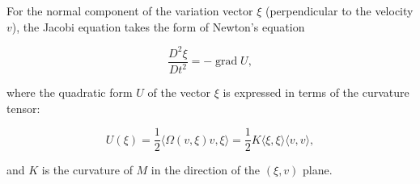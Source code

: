 For the normal component of the variation vector $\xi$ (perpendicular to the velocity $v$), the Jacobi equation takes the form of Newton's equation

$$\frac{D^2 \xi}{Dt^2} = -\operatorname{grad} U,$$

where the quadratic form $U$ of the vector $\xi$ is expressed in terms of the curvature tensor:

$$U(\xi) = \frac{1}{2} \langle \Omega(v, \xi)v, \xi \rangle = \frac{1}{2} K \langle \xi, \xi \rangle \langle v, v \rangle,$$

and $K$ is the curvature of $M$ in the direction of the $(\xi, v)$ plane.
